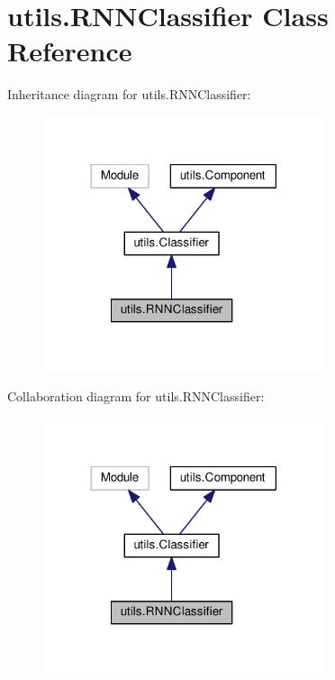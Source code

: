 \hypertarget{classutils_1_1RNNClassifier}{}\section{utils.\+R\+N\+N\+Classifier Class Reference}
\label{classutils_1_1RNNClassifier}


Inheritance diagram for utils.\+R\+N\+N\+Classifier\+:
\nopagebreak
\begin{figure}[H]
\begin{center}
\leavevmode
\includegraphics[width=234pt]{classutils_1_1RNNClassifier__inherit__graph}
\end{center}
\end{figure}


Collaboration diagram for utils.\+R\+N\+N\+Classifier\+:
\nopagebreak
\begin{figure}[H]
\begin{center}
\leavevmode
\includegraphics[width=234pt]{classutils_1_1RNNClassifier__coll__graph}
\end{center}
\end{figure}
